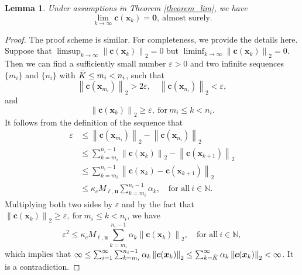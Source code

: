 \documentclass[aos]{imsart}
\numberwithin{equation}{section}
\theoremstyle{plain}
\newtheorem{lemma}{Lemma}
\begin{document}
\begin{appendix}
\begin{lemma}
\label{lemma_lim_constraints}
Under assumptions in Theorem \ref{theorem_lim}, we have 
     \begin{equation*}
        \lim_{k \to \infty} \bm{c}(\bm{x}_k) = \bm{0},~\text{almost surely}.
    \end{equation*}
\end{lemma}


\begin{proof}
    The proof scheme is similar. For completeness, we provide the details here. Suppose that $\mathop{\lim \sup}_{k \to \infty} \left\| \bm{c}(\bm{x}_k) \right\|_2 = 0$ but $\mathop{\lim \inf}_{k \to \infty} \left\| \bm{c}(\bm{x}_k) \right\|_2 = 0$. Then we can find a sufficiently small number $\varepsilon > 0$ and two infinite sequences $\{m_i\}$ and $\{n_i\}$ with $\Bar{K} \leq m_i < n_i$, such that 
    \begin{equation*}
        \left\| \bm{c}(\bm{x}_{m_i}) \right\|_2 > 2 \varepsilon, \quad \left\| \bm{c}(\bm{x}_{n_i}) \right\|_2 < \varepsilon,
    \end{equation*}
    and
    \begin{equation*}
        \left\| \bm{c}(\bm{x}_k) \right\|_2 \geq \varepsilon,~\text{for}~m_i \leq k < n_i.
    \end{equation*}
    It follows from the definition of the sequence that 
    \begin{equation*}
        \begin{split}
            \varepsilon & \leq \left\| \bm{c}(\bm{x}_{m_i}) \right\|_2 - \left\| \bm{c}(\bm{x}_{n_i}) \right\|_2 \\
            & \leq \sum_{k=m_i}^{n_i-1} \left\| \bm{c}(\bm{x}_{k}) \right\|_2 - \left\| \bm{c}(\bm{x}_{k+1}) \right\|_2 \\
            & \leq \sum_{k=m_i}^{n_i-1}   \left\| \bm{c}(\bm{x}_{k}) - \bm{c}(\bm{x}_{k+1}) \right\|_2  \\
            & \leq \kappa_{c} M_{\bm{\ell},\bm{u}} \sum_{k=m_i}^{n_i-1} \alpha_{k}, \quad \text{for all}~i \in \mathbb{N}.
        \end{split}
    \end{equation*}
    Multiplying both two sides by $\varepsilon$ and by the fact that $\left\| \bm{c}(\bm{x}_k) \right\|_2 \geq \varepsilon,~\text{for}~m_i \leq k < n_i$, we have
    \begin{equation*}
        \varepsilon^2 \leq \kappa_{c} M_{\bm{\ell},\bm{u}} \sum_{k=m_i}^{n_i-1} \alpha_{k} \left\| \bm{c}(\bm{x}_k) \right\|_2 , \quad \text{for all}~i \in \mathbb{N},
    \end{equation*}
    which implies that $\infty \leq \sum_{i=1}^{\infty} \sum_{k=m_i}^{n_i-1} \alpha_{k} \left\| \bm{c}(\bm{x}_k) \right\|_2 \leq \sum_{k=\Bar{K}}^{\infty} \alpha_{k} \left\| \bm{c}(\bm{x}_k) \right\|_2 < \infty$. It is a contradiction.
\end{proof}


\end{appendix}
\end{document}
